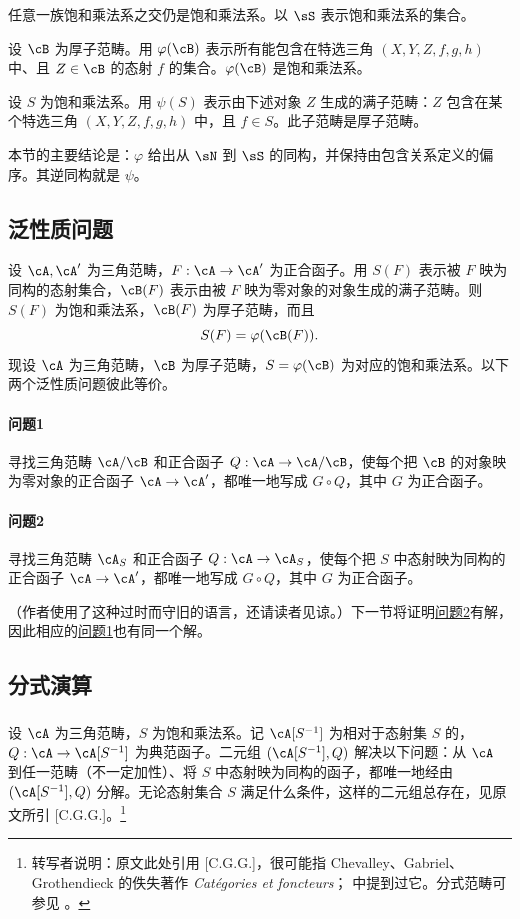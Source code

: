 任意一族饱和乘法系之交仍是饱和乘法系。以 $\sS$ 表示饱和乘法系的集合。

设 $\cB$ 为厚子范畴。用 $\varphi(\cB)$ 表示所有能包含在特选三角 $(X,Y,Z,f,g,h)$ 中、且 $Z\in\cB$ 的态射 $f$ 的集合。$\varphi(\cB)$ 是饱和乘法系。

设 $S$ 为饱和乘法系。用 $\psi(S)$ 表示由下述对象 $Z$ 生成的满子范畴：$Z$ 包含在某个特选三角 $(X,Y,Z,f,g,h)$ 中，且 $f\in S$。此子范畴是厚子范畴。

本节的主要结论是：$\varphi$ 给出从 $\sN$ 到 $\sS$ 的同构，并保持由包含关系定义的偏序。其逆同构就是 $\psi$。
\subsection{泛性质问题}\label{VIII:2-2}
设 $\cA,\cA'$ 为三角范畴，$F:\cA\to\cA'$ 为正合函子。用 $S(F)$ 表示被 $F$ 映为同构的态射集合，$\cB(F)$ 表示由被 $F$ 映为零对象的对象生成的满子范畴。则 $S(F)$ 为饱和乘法系，$\cB(F)$ 为厚子范畴，而且
\[S(F)=\varphi(\cB(F)).\]
现设 $\cA$ 为三角范畴，$\cB$ 为厚子范畴，$S=\varphi(\cB)$ 为对应的饱和乘法系。以下两个泛性质问题彼此等价。
\paragraph{问题1}\hypertarget{VIII:prob1}{}
寻找三角范畴 $\cA/\cB$ 和正合函子 $Q:\cA\to\cA/\cB$，使每个把 $\cB$ 的对象映为零对象的正合函子 $\cA\to\cA'$，都唯一地写成 $G\circ Q$，其中 $G$ 为正合函子。
\paragraph{问题2}\hypertarget{VIII:prob2}{}
寻找三角范畴 $\cA_S$ 和正合函子 $Q:\cA\to\cA_S$，使每个把 $S$ 中态射映为同构的正合函子 $\cA\to\cA'$，都唯一地写成 $G\circ Q$，其中 $G$ 为正合函子。

（作者使用了这种过时而守旧的语言，还请读者见谅。）下一节将证明\hyperlink{VIII:prob2}{问题2}有解，因此相应的\hyperlink{VIII:prob1}{问题1}也有同一个解。
\subsection{分式演算}\label{VIII:2-3}
\subsubsection{}\label{VIII:2-3-1}
设 $\cA$ 为三角范畴，$S$ 为饱和乘法系。记 $\cA[S^{-1}]$ 为相对于态射集 $S$ 的，$Q:\cA\to\cA[S^{-1}]$ 为典范函子。二元组 $(\cA[S^{-1}],Q)$ 解决以下问题：从 $\cA$ 到任一范畴（不一定加性）、将 $S$ 中态射映为同构的函子，都唯一地经由 $(\cA[S^{-1}],Q)$ 分解。无论态射集合 $S$ 满足什么条件，这样的二元组总存在，见原文所引 [C.G.G.]。\footnote{转写者说明：原文此处引用 [C.G.G.]，很可能指 Chevalley、Gabriel、Grothendieck 的佚失著作 \emph{Catégories et foncteurs}；\cite{sc72} 中提到过它。分式范畴可参见 \cite[1.1]{gz67}。}

